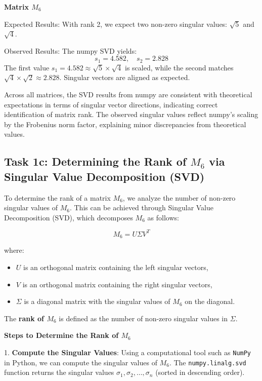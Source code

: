 \documentclass[a4paper,oneside,bibliography=totoc]{scrartcl}
\begin{document}
\textbf{Matrix \( M_6 \)}

Expected Results: With rank 2, we expect two non-zero singular values: \( \sqrt{5} \) and \( \sqrt{4} \).

Observed Results: The numpy SVD yields:
\[
s_1 = 4.582, \quad s_2 = 2.828
\]
The first value \( s_1 = 4.582 \approx \sqrt{5} \times \sqrt{4} \) is scaled, while the second matches \( \sqrt{4} \times \sqrt{2} \approx 2.828 \). Singular vectors are aligned as expected.


Across all matrices, the SVD results from numpy are consistent with theoretical expectations in terms of singular vector directions, indicating correct identification of matrix rank. The observed singular values reflect numpy’s scaling by the Frobenius norm factor, explaining minor discrepancies from theoretical values.

\subsection{Task 1c: Determining the Rank of \( M_6 \) via Singular Value Decomposition (SVD)}

To determine the rank of a matrix \( M_6 \), we analyze the number of non-zero singular values of \( M_6 \). This can be achieved through Singular Value Decomposition (SVD), which decomposes \( M_6 \) as follows:

\[
M_6 = U \Sigma V^T
\]

where:
\begin{itemize}
    \item \( U \) is an orthogonal matrix containing the left singular vectors,
    \item \( V \) is an orthogonal matrix containing the right singular vectors,
    \item \( \Sigma \) is a diagonal matrix with the singular values of \( M_6 \) on the diagonal.
\end{itemize}

The \textbf{rank of \( M_6 \)} is defined as the number of non-zero singular values in \( \Sigma \).

\textbf{Steps to Determine the Rank of \( M_6 \)}

1. \textbf{Compute the Singular Values}:
    Using a computational tool such as \texttt{NumPy} in Python, we can compute the singular values of \( M_6 \).
    The \texttt{numpy.linalg.svd} function returns the singular values \( \sigma_1, \sigma_2, \dots, \sigma_n \) (sorted in descending order).
\end{document}
